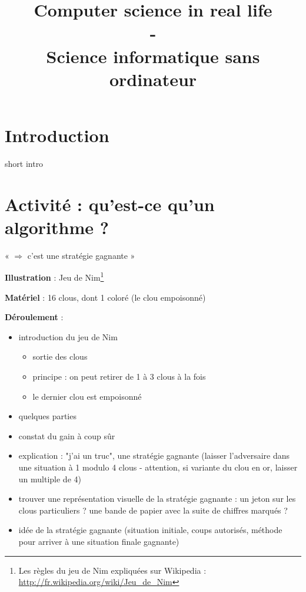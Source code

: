 \documentclass{article}
\title{Computer science in real life\\ -\\ Science informatique sans ordinateur}
\newcommand{\titre}[1]{\medskip\noindent\textbf{#1} : }
\newcommand{\illustration}{\titre{Illustration}}
\newcommand{\materiel}{\titre{Matériel}}
\newcommand{\deroulement}{\titre{Déroulement}}
\begin{document}
\date{}

\maketitle


\section{Introduction}
short intro

\section{Activité : qu'est-ce qu'un algorithme ?}
« $\Rightarrow$ c'est une stratégie gagnante »

\illustration Jeu de Nim\footnote{Les règles du jeu de Nim expliquées sur
Wikipedia : \url{http://fr.wikipedia.org/wiki/Jeu_de_Nim}}

\materiel 16 clous, dont 1 coloré (le clou empoisonné)

\deroulement
\begin{itemize}
\item introduction du jeu de Nim
\begin{itemize}
\item sortie des clous
\item principe : on peut retirer de 1 à 3 clous à la fois
\item le dernier clou est empoisonné
\end{itemize}
\item quelques parties
\item constat du gain à coup sûr
\item explication : "j'ai un truc", une stratégie gagnante (laisser l'adversaire dans une situation à 1 modulo 4 clous - attention, si variante du clou en or, laisser un multiple de 4)
\item trouver une représentation visuelle de la stratégie gagnante : un jeton sur les clous particuliers ? une bande de papier avec la suite de chiffres marqués ? 
\item idée de la stratégie gagnante (situation initiale, coups autorisés, méthode pour arriver à une situation finale gagnante)
\end{itemize}
\end{document}
